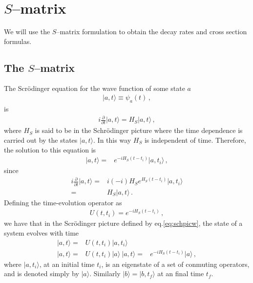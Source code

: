 \chapter{$S$--matrix}
\label{cha:s-matrix} %


We will use the $S$--matrix formulation to obtain the decay rates and cross section formulas. 

\section{The $S$--matrix}
\label{sec:s-matrix}
The Scr\"odinger equation for the wave function of some state $a$
\begin{align}
  |a,t\rangle\equiv\psi_a(t)\,,
\end{align}
is
\begin{align}
i\frac{\partial}{\partial t}|a,t\rangle=H_S|a,t\rangle\,,
\end{align}
where $H_S$ is said to be in the Schr\"odinger picture where the time dependence is carried out by the states $|a,t\rangle$. In this way $H_S$ is independent of time. Therefore, the solution to this equation is
\begin{align}
  \label{eq:schpicw}
   |a,t\rangle=&e^{-i H_S(t-t_i)}|a,t_i\rangle\,,
\end{align}
since
\begin{align}
  i\frac{\partial}{\partial t}|a,t\rangle=&i(-i)H_S e^{H_S(t-t_i)}|a,t_i\rangle\nonumber\\
=&H_S |a,t\rangle\,.
\end{align}
Defining the time-evolution operator as
\begin{align}
 \label{eq:40f}
  U(t,t_i)=e^{-i H_S(t-t_i)}\,,
\end{align}
we have that in the Scr\"odinger picture defined by
eq.\eqref{eq:schpicw}, the state of a system evolves with time
\begin{align}
\label{eq:39fa}
  |a,t\rangle=&U(t,t_i)|a,t_i\rangle\\
  |a,t\rangle=&U(t,t_i)|a\rangle\nonumber\
\label{eq:39f}
  |a,t\rangle=&e^{-i H_S(t-t_i)}|a\rangle\,,
\end{align}
where $|a,t_i\rangle$, at an initial time $t_i$, is an eigenstate of a set of conmuting operators, and is denoted simply by $|a\rangle$. Similarly $|b\rangle=|b,t_f\rangle$ at an final time $t_f$.

